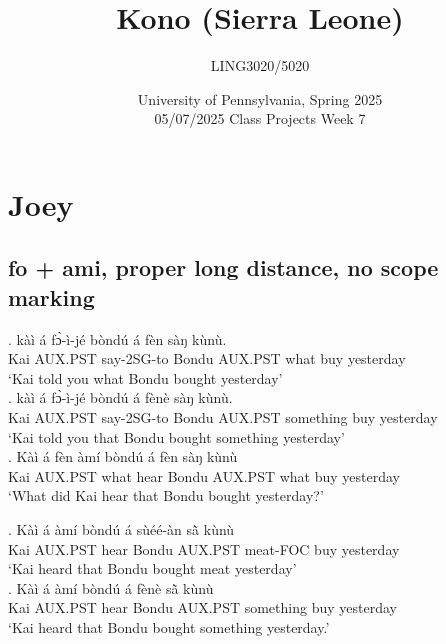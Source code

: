 \documentclass{assets/fieldnotes}
\title{Kono (Sierra Leone)}
\author{LING3020/5020}
\date{University of Pennsylvania, Spring 2025\\05/07/2025 Class Projects Week 7}
\begin{document}
\maketitle

\maketitle
\tableofcontents


\section{Joey}

\subsection{fo + ami, proper long distance, no scope marking}

\exg. kàì á fɔ̀-ì-jé bòndú á fèn sàŋ kùnù.\\
Kai AUX.PST say-2SG-to Bondu AUX.PST what buy yesterday\\
`Kai told you what Bondu bought yesterday'  \\

\exg. kàì á fɔ̀-ì-jé bòndú á fènè sàŋ kùnù.\\
Kai AUX.PST say-2SG-to Bondu AUX.PST something buy yesterday\\
`Kai told you that Bondu bought something yesterday'  \\

\exg.  Kàì á fèn àmí bòndú á fèn sàŋ kùnù\\
Kai AUX.PST what hear Bondu AUX.PST what buy yesterday\\
`What did Kai hear that Bondu bought yesterday?' \\


\exg. Kàì á àmí bòndú á sùéé-àn sã̀  kùnù\\
Kai AUX.PST hear Bondu AUX.PST meat-FOC buy yesterday\\
`Kai heard that Bondu bought meat yesterday'  \\

\exg.  Kàì á àmí bòndú á fènè sã̀  kùnù\\
Kai AUX.PST hear Bondu AUX.PST something buy yesterday\\
`Kai heard that Bondu bought something yesterday.' \\
\end{document}
